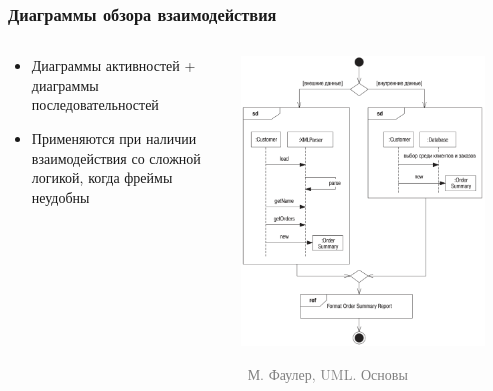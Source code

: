 \documentclass[xetex,mathserif,serif]{beamer}
\newcommand{\attribution}[1] {
	\vspace{-5mm}\begin{flushright}\begin{scriptsize}\textcolor{gray}{\textcopyright\, #1}\end{scriptsize}\end{flushright}
}
\begin{document}
	\begin{frame}
		\frametitle{Диаграммы обзора взаимодействия}
		\begin{columns}
			\begin{column}{0.5\textwidth}
				\begin{itemize}
					\item Диаграммы активностей + диаграммы последовательностей
					\item Применяются при наличии взаимодействия со сложной логикой, когда фреймы неудобны
				\end{itemize}
			\end{column}
			\begin{column}{0.5\textwidth}
				\begin{center}
					\includegraphics[width=0.9\textwidth]{interactionOverviewDiagrams.png}
					\attribution{М. Фаулер, UML. Основы}
				\end{center}
			\end{column}
		\end{columns}
	\end{frame}
\end{document}
